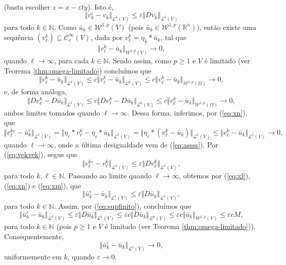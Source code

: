 \documentclass[a4paper, 11pt]{book}
\theoremstyle{definition}
\newcommand{\bN}{\mathbb{N}}
\newcommand{\bR}{\mathbb{R}}
\newcommand{\cC}{\mathcal{C}}
\newcommand{\cL}{\mathcal{L}}
\newcommand{\cW}{\mathcal{W}}
\begin{document}
\begin{prf}
\[\begin{aligned}
        \end{aligned}
    \]
    (basta escolher $z = x - \varepsilon t y$).
    Isto é,
    \begin{equation} \label{eq:vekvek}
        \Vert v_k^\varepsilon - v_k \Vert_{\cL^1(V)} \leqslant \varepsilon \Vert Dv_k \Vert_{\cL^1(V)}
    \end{equation}
    para todo $k \in \bN$. Como $\bar u_k \in \cW^{1,p}(V) $ (pois $\bar u_k \in \cW^{1,p}(\bR^n)$), então existe uma sequência $(v^k_\ell) \subseteq \cC^{\infty}_c(V)$, dada por $v^k_\ell = \eta_{\frac{1}{\ell}} * \bar{u}_k$, tal que
    \[
        \Vert v^k_\ell - \bar{u}_k \Vert_{\cW^{1,p}(V)} \to 0,
    \]
    quando $\ell \to \infty$, para cada $k \in \bN$.
    Sendo assim, como $p \geqslant 1$ e $V$ é limitado (ver Teorema \ref{thm:omega-limitado}) concluímos que
    \begin{equation} \label{eq:xl}
        \Vert v^k_\ell - \bar{u}_k \Vert_{\cL^1(V)} \leqslant c \Vert v^k_\ell - \bar{u}_k \Vert_{\cL^p(V)} \leqslant c \Vert v^k_\ell - \bar{u}_k \Vert_{\cW^{1,p}(\Omega)} \to 0,
    \end{equation}
    e, de forma análoga,
    \begin{equation} \label{eq:xn}
        \Vert Dv^k_\ell - D\bar{u}_k \Vert_{\cL^1(V)}\leqslant c \Vert Dv^k_\ell - D\bar{u}_k \Vert_{\cL^p(V)} \leqslant c \Vert v^k_\ell - \bar{u}_k \Vert_{\cW^{1,p}(\Omega)} \to 0,
    \end{equation}
    ambos limites tomados quando $\ell \to \infty$. Dessa forma, inferimos, por (\ref{eq:xn}), que
    \begin{equation} \label{eq:xm}
        \Vert v^{k\varepsilon}_\ell - \bar u_k^{\varepsilon} \Vert_{\cL^1(V)} = \Vert \eta_\varepsilon * v^k_\ell - \eta_\varepsilon * \bar u_k \Vert_{\cL^1(V)} = \Vert \eta_\varepsilon  * (v^k_\ell - \bar u_k) \Vert_{\cL^1(V)} \leqslant \Vert v^k_\ell - \bar u_k \Vert_{\cL^1(V)} \to 0,
    \end{equation}
    quando $\ell \to \infty$, onde a última desigualdade vem de (\ref{eq:assss}).
    Por (\ref{eq:vekvek}), segue que
    \[
        \Vert v^{k\varepsilon}_\ell - v^k_\ell \Vert_{\cL^1(V)} \leqslant \varepsilon \Vert D v^k_\ell \Vert_{\cL^1(V)},
    \]
    para todo $k,\ell \in \bN$. Passando ao limite quando $\ell \to \infty$, obtemos por (\ref{eq:xl}), (\ref{eq:xn}) e (\ref{eq:xm}), que
    \[
        \Vert \bar u_k^\varepsilon - \bar u_k \Vert_{\cL^1(V)} \leqslant \varepsilon \Vert D\bar u_k \Vert_{\cL^1(V)},
    \]
    para todo $k \in \bN$. Assim, por (\ref{eq:supfinito}), concluímos que
    \[
        \Vert \bar u_k^\varepsilon - \bar u_k \Vert_{\cL^1(V)} \leqslant \varepsilon \Vert D\bar u_k \Vert_{\cL^1(V)} \leqslant \varepsilon c \Vert D\bar u_k \Vert_{\cL^p(V)} \leqslant \varepsilon c \Vert \bar u_k \Vert_{\cW^{1,p}(V)} \leqslant \varepsilon c M,
    \]
    para todo $k \in \bN$ (pois $p \geqslant 1$ e $V$ é limitado (ver Teorema \ref{thm:omega-limitado})). Consequentemente,
    \begin{equation} \label{eq:eml1converge2}
        \Vert \bar u_k^\varepsilon - \bar u_k \Vert_{\cL^1 (V)} \to 0,
    \end{equation}
    uniformemente em $k$, quando $\varepsilon \to 0$. 
    

\end{prf}
\end{document}
